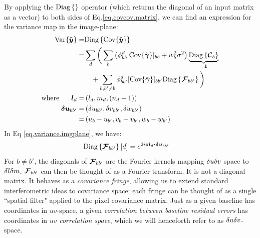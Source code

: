 \pg
By applying the $\text{Diag}\left\{\right\}$ operator (which returns the diagonal of an input matrix as a vector) to both sides of Eq.\ref{eq.covcov.matrix}, we can find an expression for the variance map in the image-plane:
\begin{align}
\textrm{Var}\{\tilde{\bm{{{y}}}}\}      =& \text{Diag}\left\{\textrm{Cov}\{\tilde{\bm{{{y}}}}\}\right\}\\
                  =& \sum_d \bigg(\sum_b  \left(\phi_{bb}^d  [\textrm{Cov}\{\bm{\tilde{\gamma}}\}]_{bb} + w_b^2 \sigma^2 \right) \underbrace{\text{Diag}\left\{\bm{\mathcal{C}}_b\right\}}_{= \bm{1}} \nonumber\\
                   &\quad+  \sum_{b,b'\ne b}  \phi_{bb'}^d [\textrm{Cov}\{\bm{\tilde{\gamma}}\}]_{bb'} \text{Diag}\left\{\bm{\mathcal{F}}_{bb'}\right\}\bigg)\label{eq.variance.imgplane}\\
\mathrm{where}\hspace{0.6cm}\bm{l}_d =& \left({l_d,m_d,\left(n_d-1\right)}\right)\\
\bm{\delta u}_{bb'} =& \left({\delta u}_{bb'},{\delta v}_{bb'},{\delta w}_{bb'}\right)\\
 				  =& \left( u_b - u_{b'},v_b-v_{b'},w_b-w_{b'}\right)
\end{align}
In Eq \ref{eq.variance.imgplane}, we have:
\begin{align}
\diag{\muelF_{bb'}}[d] &= e^{2i\pi \bm{l}_d \bm{\cdot} \bm{\deltu}_{bb'} }%
\end{align}
{For $b\ne b'$, the diagonals of $\bm{\mathcal{F}}_{bb'}$ are the Fourier kernels mapping $\delta u \delta v$ space to $\delta l\delta m$. $\bm{\mathcal{F}}_{bb'}$ can then be thought of as a Fourier transform.} {It is not a diagonal matrix.}
It behaves as a \emph{covariance fringe}, allowing us to extend standard interferometric ideas to covariance space: each fringe can be thought of as a single ``spatial filter" applied to the pixel covariance matrix. Just as a given baseline has coordinates in $uv$-space, a given \emph{correlation between baseline {residual errors}} has coordinates in $uv$ \emph{correlation space}, which we will henceforth refer to as $\delta u\delta v$-space.

